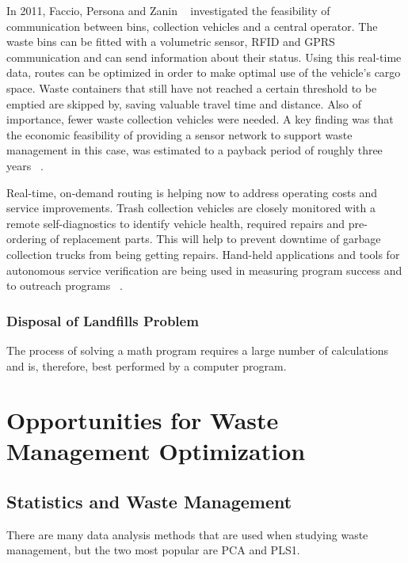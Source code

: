 \documentclass[sigconf]{acmart}
\begin{document}
In 2011, Faccio, Persona and Zanin ~\cite{faccio2011} investigated the feasibility of communication between bins, collection vehicles and a central operator. The waste bins can be fitted with a volumetric sensor, RFID and GPRS communication and can send information about their status. Using this real-time data, routes can be optimized in order to make optimal use of the vehicle's cargo space. Waste containers that still have not reached a certain threshold to be emptied are skipped by, saving valuable travel time and distance. Also of importance, fewer waste collection vehicles were needed. A key ﬁnding was that the economic feasibility of providing a sensor network to support waste management in this case, was estimated to a payback period of roughly three years ~\cite{shahrokni2014big}.

Real-time, on-demand routing is helping now to address operating costs and service improvements. Trash collection vehicles are closely monitored with a remote self-diagnostics to identify vehicle health, required repairs and pre-ordering of replacement parts. This will help to prevent downtime of garbage collection trucks from being getting repairs. Hand-held applications and tools for autonomous service verification are being used in measuring program success and to outreach programs ~\cite{Megan2017}.


\subsubsection{Disposal of Landfills Problem}

The process of solving a math program requires a large number of calculations and is, therefore, best performed by a computer program. ~\cite{akbarpour2016}

\section{Opportunities for Waste Management Optimization}


\subsection{Statistics and Waste Management}

There are many data analysis methods that are used when studying waste management, but the two most popular are PCA and PLS1. 
~\cite{bohm2013}
\end{document}
